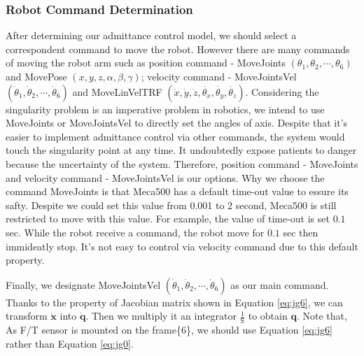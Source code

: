 \subsubsection{Robot Command Determination}
After determining our admittance control model, we should select a correspondent command to move the robot. However there are many commands of moving the robot arm such as position command - MoveJoints $\left(\theta _1, \theta _2,\cdots , \theta _6 \right)$ and MovePose $\left(x,y,z,\alpha ,\beta ,\gamma \right)$; velocity command - MoveJointsVel $\left(\dot{\theta}_1, \dot{\theta}_2,\cdots , \dot{\theta}_6 \right)$ and MoveLinVelTRF $\left(\dot{x},\dot{y},\dot{z},\dot{\theta _x},\dot{\theta _y},\dot{\theta _z}\right)$. Considering the singularity problem is an imperative problem in robotics, we intend to use MoveJoints or MoveJointsVel to directly set the angles of axis. Despite that it's easier to implement admittance control via other commands, the system would touch the singularity point at any time. It undoubtedly expose patients to danger because the uncertainty of the system. Therefore, position command - MoveJoints and velocity command - MoveJointsVel is our options. Why we choose the command MoveJoints  is that Meca500 has a default time-out value to essure its safty. Despite we could set this value from 0.001 to 2 second, Meca500 is still restricted to move with this value. For example, the value of time-out is set $0.1$ sec. While the robot receive a command, the robot move for $0.1$ sec then immideatly stop. It's not easy to control via velocity command due to this default property.
\par
Finally, we designate MoveJointsVel $\left(\dot{\theta}_1, \dot{\theta}_2,\cdots , \dot{\theta}_6 \right)$ as our main command. Thanks to the property of Jacobian matrix shown in Equation \ref{eq:jg6}, we can transform $\boldsymbol{\dot{x}}$ into $\boldsymbol{\dot{q}}$. Then we multiply it an integrator $\frac{1}{\mathrm{S}}$
to obtain $\boldsymbol{q}$. Note that, As F/T sensor is mounted on the frame\{6\}, we should use Equation \ref{eq:jg6} rather than Equation \ref{eq:jg0}. 
